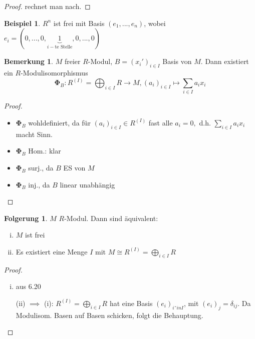 \documentclass[a4paper, titlepage]{article}
\theoremstyle{definition}
\newtheorem{Folgerung}[satz]{Folgerung}
\newtheorem{bsp}[satz]{Beispiel}
\newtheorem{bem}[satz]{Bemerkung}
\begin{document}
        \begin{proof}
            rechnet man nach.
        \end{proof}
        \begin{bsp}
        $R^n$ ist frei mit Basis $(e_1,...,e_n)$, wobei $e_i=(0,...,0,\underbrace{1}_{i-\text{te Stelle}},0,...,0)$
        \end{bsp}
        \begin{bem}
            $M$ freier $R$-Modul, $B=(x_i')_{i\in I}$ Basis von $M.$ Dann existiert ein $R$-Modulisomorphismus
            $$\boldsymbol{\Phi}_B:R^{(I)}=\bigoplus_{i\in I}R\longrightarrow M,(a_i)_{i\in I}\mapsto \sum_{i\in I}a_ix_i$$
        \end{bem}
        \begin{proof}
            \begin{itemize}
                \item $\boldsymbol{\Phi}_B$ wohldefiniert, da für $(a_i)_{i\in I}\in R^{(I)}$ fast alle $a_i=0,$ d.h. $\sum_{i\in I}a_ix_i$ macht Sinn.
                \item  $\boldsymbol{\Phi}_{B}$ Hom.: klar 
                \item $\boldsymbol{\Phi}_{B}$ surj., da $B$ ES von $M$
                \item $\boldsymbol{\Phi}_{B}$ inj., da $B$ linear unabhängig
            \end{itemize}
        \end{proof}
        \begin{Folgerung}
            $M$ $R$-Modul. Dann sind äquivalent:
            \begin{enumerate}[(i)]
                \item $M$ ist frei
                \item Es existiert eine Menge $I$ mit $M\cong R^{(I)}=\bigoplus\limits_{i\in I} R$
            \end{enumerate}
        \end{Folgerung}
        \begin{proof}
            \begin{enumerate}[(i)$\implies$ (ii):]
                \item aus 6.20
                \item [(ii) $\implies$ (i):] $R^{(I)}=\bigoplus\limits_{i\in I}R$ hat eine Basis $(e_i)_{i˜in I}$, mit $(e_i)_j=\delta_{ij}.$ Da Modulisom. Basen auf Basen schicken, folgt die Behauptung. 
            \end{enumerate}
        \end{proof}
\end{document}
